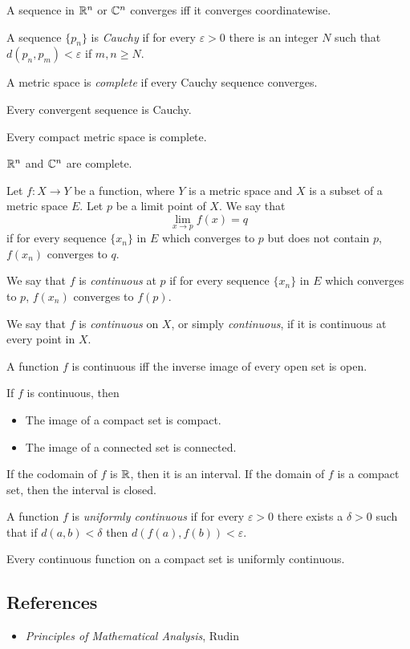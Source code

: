 \begin{prop}
  A sequence in $\mathbb{R}^n$ or $\mathbb{C}^n$ converges iff it converges coordinatewise.
\end{prop}
\begin{defn}
  A sequence $\{p_n\}$ is \emph{Cauchy} if for every $\varepsilon>0$ there is an
  integer $N$ such that $d(p_n,p_m)<\varepsilon$ if $m,n\ge N$.

  A metric space is \emph{complete} if every Cauchy sequence converges.
\end{defn}
\begin{prop}
  Every convergent sequence is Cauchy.
\end{prop}
\begin{prop}
  Every compact metric space is complete.
\end{prop}
\begin{prop}
  $\mathbb{R}^n$ and $\mathbb{C}^n$ are complete.
\end{prop}
\begin{defn}
  Let $f:X\to Y$ be a function, where $Y$ is a metric space and $X$ is a 
  subset of a metric space $E$. Let $p$ be a limit point of $X$. We say that
  \[\lim_{x\to p}f(x)=q\] if for every sequence $\{x_n\}$ in $E$ which converges
  to $p$ but does not contain $p$, $f(x_n)$ converges to $q$.
\end{defn}
\begin{defn}
  We say that $f$ is \emph{continuous} at $p$
  if for every sequence $\{x_n\}$ in $E$ which converges
  to $p$, $f(x_n)$ converges to $f(p)$.

  We say that $f$ is \emph{continuous} on $X$, or simply \emph{continuous},
  if it is continuous at every point in $X$.
\end{defn}
\begin{prop}
  A function $f$ is continuous iff the inverse image of every open set is open.
\end{prop}
\begin{prop}
  If $f$ is continuous, then
  \begin{itemize}
    \item The image of a compact set is compact.
    \item The image of a connected set is connected.
  \end{itemize}
\end{prop}
\begin{cor}
  If the codomain of $f$ is $\mathbb{R}$, then it is an interval. If the domain of $f$
  is a compact set, then the interval is closed.
\end{cor}
\begin{defn}
  A function $f$ is \emph{uniformly continuous} if for every $\varepsilon>0$
  there exists a $\delta>0$ such that if $d(a,b)<\delta$ then
  $d(f(a),f(b))<\varepsilon$.
\end{defn}
\begin{thm}
  Every continuous function on a compact set is uniformly continuous.
\end{thm}
\subsection*{References}
\begin{itemize}
  \item \emph{Principles of Mathematical Analysis}, Rudin
\end{itemize}
